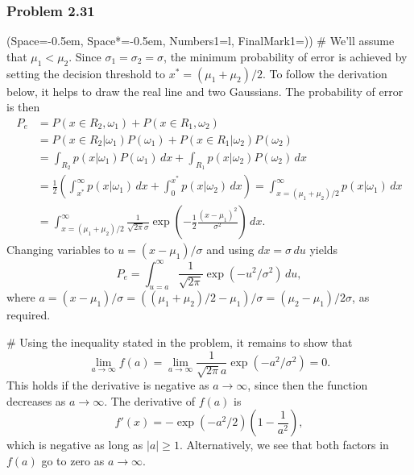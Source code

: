 \documentclass[12pt, a4paper]{article}
\newcommand{\listSpace}{-0.5em}%
\newcommand{\abs}[1]{\left\lvert#1\right\rvert}
\begin{document}
\subsubsection*{Problem 2.31}
\begin{easylist}[enumerate]
\ListProperties(Space=\listSpace, Space*=\listSpace, Numbers1=l, FinalMark1={)})
# We'll assume that $\mu_1 < \mu_2$.
Since $\sigma_1 = \sigma_2 = \sigma$, the minimum probability of error is achieved by setting the decision threshold to $x^* = (\mu_1 + \mu_2)/2$.
To follow the derivation below, it helps to draw the real line and two Gaussians.
The probability of error is then
\begin{align*}
	P_e &= P(x \in R_2, \omega_1) + P(x \in R_1, \omega_2) \\
	&= 
	P(x \in R_2 | \omega_1) P(\omega_1)  + P(x \in R_1 | \omega_2) P(\omega_2) \\&= 
	\int_{R_2} p(x | \omega_1) P(\omega_1) \, dx + \int_{R_1} p(x | \omega_2) P(\omega_2) \, dx
	 \\
	 &= \frac{1}{2}\left( \int_{x^*}^{\infty} p(x | \omega_1) \, dx + 
	 \int_{0}^{x^*} p(x | \omega_2) \, dx \right) = \int_{x =(\mu_1 + \mu_2)/2 }^{\infty} p(x | \omega_1) \, dx \\
	 &=
	 \int_{x =(\mu_1 + \mu_2)/2 }^{\infty} \frac{1}{\sqrt{2 \pi } \sigma} \exp\left( - \frac{1}{2} \frac{(x - \mu_1)^2}{\sigma^2}\right) \, dx.
\end{align*}
Changing variables to $u = (x - \mu_1) / \sigma$ and using $dx = \sigma \, du$ yields
\begin{equation*}
	P_e = \int_{u=a}^{\infty} \frac{1}{\sqrt{2 \pi }} \exp\left( -u^2 /\sigma^2 \right) \, du,
\end{equation*}
where $a = (x - \mu_1 )/\sigma = ((\mu_1 + \mu_2)/2 - \mu_1 )/\sigma =  (\mu_2 - \mu_1) / 2 \sigma$, as required.

# Using the inequality stated in the problem, it remains to show that
\begin{equation*}
	\lim_{a \to \infty} f(a) = \lim_{a \to \infty} \frac{1}{\sqrt{2 \pi} a} \exp\left( -a^2 /\sigma^2 \right) = 0.
\end{equation*}
This holds if the derivative is negative as $a \to \infty$, since then the function decreases as $a \to \infty$. The derivative of $f(a)$ is
\begin{equation*}
	f'(x) = -\exp\left( -a^2 / 2\right) \left( 1 - \frac{1}{a^2}\right),
\end{equation*}
which is negative as long as $\abs{a} \geq 1$.
Alternatively, we see that both factors in $f(a)$ go to zero as $a \to \infty$.
\end{easylist}
\end{document}
